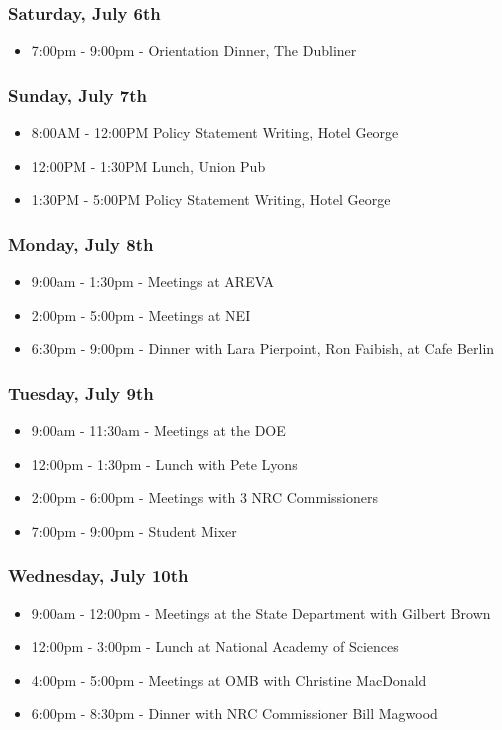 \subsubsection*{Saturday, July 6th}
\begin{itemize}
  \item 7:00pm - 9:00pm - Orientation Dinner, The Dubliner
\end{itemize}

\subsubsection*{Sunday, July 7th}
\begin{itemize}
  \item 8:00AM - 12:00PM Policy Statement Writing, Hotel George
  \item 12:00PM - 1:30PM Lunch, Union Pub
  \item 1:30PM - 5:00PM Policy Statement Writing, Hotel George
\end{itemize}

\subsubsection*{Monday, July 8th}
\begin{itemize}
  \item 9:00am - 1:30pm - Meetings at AREVA
  \item 2:00pm - 5:00pm - Meetings at NEI
  \item 6:30pm - 9:00pm - Dinner with Lara Pierpoint, Ron Faibish, at Cafe Berlin
\end{itemize}

\subsubsection*{Tuesday, July 9th}
\begin{itemize}
  \item 9:00am - 11:30am - Meetings at the DOE
  \item 12:00pm - 1:30pm - Lunch with Pete Lyons
  \item 2:00pm - 6:00pm - Meetings with 3 NRC Commissioners
  \item 7:00pm - 9:00pm - Student Mixer
\end{itemize}

\subsubsection*{Wednesday, July 10th}
\begin{itemize}
  \item 9:00am - 12:00pm - Meetings at the State Department with Gilbert Brown
  \item 12:00pm - 3:00pm - Lunch at National Academy of Sciences
  \item 4:00pm - 5:00pm - Meetings at OMB with Christine MacDonald
  \item 6:00pm - 8:30pm - Dinner with NRC Commissioner Bill Magwood
\end{itemize}


